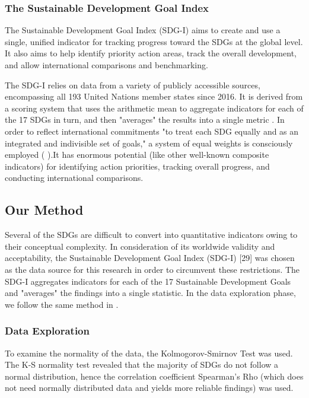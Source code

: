 \documentclass{mcmthesis}
\begin{document}
\subsubsection{ The Sustainable Development Goal Index }
The Sustainable Development Goal Index (SDG-I) \cite{stiftung2018sustainable} aims to create and use a single, unified indicator for tracking progress toward the SDGs at the global level. It also aims to help identify priority action areas, track the overall development, and allow international comparisons and benchmarking.

The SDG-I relies on data from a variety of publicly accessible sources, encompassing all 193 United Nations member states since 2016. It is derived from a scoring system that uses the arithmetic mean to aggregate indicators for each of the 17 SDGs in turn, and then "averages" the results into a single metric \cite{biggeri2019tracking}. In order to reflect international commitments "to treat each SDG equally and as an integrated and indivisible set of goals," a system of equal weights is consciously employed ( \cite{stiftung2018sustainable}).It has enormous potential (like other well-known composite indicators) for identifying action priorities, tracking overall progress, and conducting international comparisons.

\subsection{ Our Method}
Several of the SDGs are difficult to convert into quantitative indicators owing to their conceptual complexity. 
In consideration of its worldwide validity and acceptability, the Sustainable Development Goal Index (SDG-I) [29] was chosen as the data source for this research in order to circumvent these restrictions. 
The SDG-I aggregates indicators for each of the 17 Sustainable Development Goals and "averages" the findings into a single statistic. 
In the data exploration phase, we follow the same method in \cite{fonseca2020mapping}.


\subsubsection{Data Exploration}
To examine the normality of the data, the Kolmogorov-Smirnov Test was used. 
The K-S normality test revealed that the majority of SDGs do not follow a normal distribution, hence the correlation coefficient Spearman's Rho (which does not need normally distributed data and yields more reliable findings) was used.
\end{document}
